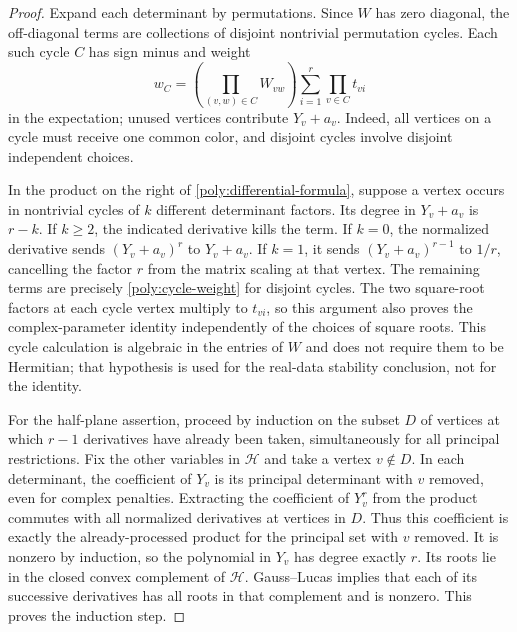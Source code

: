 \begin{proof}
Expand each determinant by permutations. Since $W$ has zero diagonal,
the off-diagonal terms are collections of disjoint nontrivial permutation
cycles. Each such cycle $C$ has sign minus and weight
\begin{equation}\label{poly:cycle-weight}
 w_C=\left(\prod_{(v,w)\in C}W_{vw}\right)
 \sum_{i=1}^r\prod_{v\in C}t_{vi}
\end{equation}
in the expectation; unused vertices contribute $Y_v+a_v$. Indeed, all
vertices on a cycle must receive one common color, and disjoint cycles
involve disjoint independent choices.

In the product on the right of \eqref{poly:differential-formula}, suppose
a vertex occurs in nontrivial cycles of $k$ different determinant factors.
Its degree in $Y_v+a_v$ is $r-k$. If $k\geq2$, the indicated derivative
kills the term. If $k=0$, the normalized derivative sends
$(Y_v+a_v)^r$ to $Y_v+a_v$. If $k=1$, it sends
$(Y_v+a_v)^{r-1}$ to $1/r$, cancelling the factor $r$ from the matrix
scaling at that vertex. The remaining terms are precisely
\eqref{poly:cycle-weight} for disjoint cycles. The two square-root factors
at each cycle vertex multiply to $t_{vi}$, so this argument also proves
the complex-parameter identity independently of the choices of square roots.
This cycle calculation is algebraic in the entries of $W$ and does not
require them to be Hermitian; that hypothesis is used for the real-data
stability conclusion, not for the identity.

For the half-plane assertion, proceed by induction on the subset $D$ of
vertices at which $r-1$ derivatives have already been taken, simultaneously
for all principal restrictions. Fix the other variables in $\mathcal H$
and take a vertex $v\notin D$. In each determinant, the coefficient of
$Y_v$ is its principal determinant with $v$ removed, even for complex
penalties. Extracting the coefficient of $Y_v^r$ from the product
commutes with all normalized derivatives at vertices in $D$. Thus this
coefficient is exactly the already-processed product for the principal
set with $v$ removed. It is
nonzero by induction, so the polynomial in $Y_v$ has degree exactly $r$.
Its roots lie in the closed convex complement of $\mathcal H$.
Gauss--Lucas implies that each of its successive derivatives has all roots
in that complement and is nonzero. This proves the induction step.


\end{proof}
